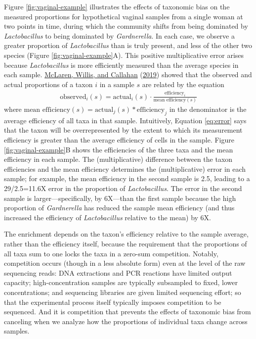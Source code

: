 \documentclass[
]{article}
\theoremstyle{definition}
\theoremstyle{definition}
\theoremstyle{definition}
\theoremstyle{definition}
\theoremstyle{remark}
\begin{document}
Figure \ref{fig:vaginal-example} illustrates the effects of taxonomic bias on the measured proportions for hypothetical vaginal samples from a single woman at two points in time, during which the community shifts from being dominated by \emph{Lactobacillus} to being dominated by \emph{Gardnerella}.
In each case, we observe a greater proportion of \emph{Lactobacillus} than is truly present, and less of the other two species (Figure \ref{fig:vaginal-example}A).
This positive multiplicative error arises because \emph{Lactobacillus} is more efficiently measured than the average species in each sample.
\protect\hyperlink{ref-mclaren2019cons}{McLaren, Willis, and Callahan} (\protect\hyperlink{ref-mclaren2019cons}{2019}) showed that the observed and actual proportions of a taxon \(i\) in a sample \(s\) are related by the equation
\begin{align}
  \label{eq:error}
  \text{observed}_{i}(s) = \text{actual}_{i}(s) \cdot \frac{\text{efficiency}_{i}}{\text{mean efficiency}(s)}
\end{align}
where \(\text{mean efficiency}(s)=\text{actual}_j(s)*\text{efficiency}_j\) in the denominator is the average efficiency of all taxa in that sample.
Intuitively, Equation \eqref{eq:error} says that the taxon will be overrepresented by the extent to which its measurement efficiency is greater than the average efficiency of cells in the sample.
Figure \ref{fig:vaginal-example}B shows the efficiencies of the three taxa and the mean efficiency in each sample.
The (multiplicative) difference between the taxon efficiencies and the mean efficiency determines the (multiplicative) error in each sample; for example, the mean efficiency in the second sample is 2.5, leading to a 29/2.5=11.6X error in the proportion of \emph{Lactobacillus}.
The error in the second sample is larger---specifically, by 6X---than the first sample because the high proportion of \emph{Gardnerella} has reduced the sample mean efficiency (and thus increased the efficiency of \emph{Lactobacillus} relative to the mean) by 6X.

The enrichment depends on the taxon's efficiency relative to the sample average, rather than the efficiency itself, because the requirement that the proportions of all taxa sum to one locks the taxa in a zero-sum competition.
Notably, competition occurs (though in a less absolute form) even at the level of the raw sequencing reads: DNA extractions and PCR reactions have limited output capacity; high-concentration samples are typically subsampled to fixed, lower concentrations; and sequencing libraries are given limited sequencing effort; so that the experimental process itself typically imposes competition to be sequenced.
And it is competition that prevents the effects of taxonomic bias from canceling when we analyze how the proportions of individual taxa change across samples.
\end{document}
